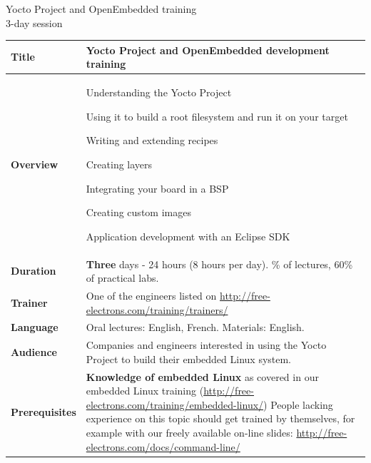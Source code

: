 \documentclass[a4paper,12pt,obeyspaces,spaces,hyphens]{article}
\begin{document}
\thispagestyle{fancy}

\setlength{\arrayrulewidth}{0.8pt}

\begin{center}
\LARGE
Yocto Project and OpenEmbedded training\\
\large
3-day session
\end{center}
\vspace{1cm}

\small
{}

 {
  \begin{tabularx}{\textwidth}{|g|h|}
    {\bf Title} & {\bf Yocto Project and OpenEmbedded development training} \\
    \hline

    {\bf Overview} &
    Understanding the Yocto Project \par
    Using it to build a root filesystem and run it on your target \par
    Writing and extending recipes \par
    Creating layers \par
    Integrating your board in a BSP \par
    Creating custom images \par
    Application development with an Eclipse SDK \\
    \hline

    {\bf Duration} & {\bf Three} days - 24 hours (8 hours per day).
    \% of lectures, 60\% of practical labs. \\
    \hline

    {\bf Trainer} & One of the engineers listed on
    \newline \url{http://free-electrons.com/training/trainers/}\\
    \hline

    {\bf Language} & Oral lectures: English, French.
    \newline Materials: English.\\
    \hline

    {\bf Audience} & Companies and engineers interested in using
    the Yocto Project to build their embedded Linux system.\\
    \hline

    {\bf Prerequisites} & {\bf Knowledge of embedded Linux} as covered
    in our embedded Linux training
    (\url{http://free-electrons.com/training/embedded-linux/}) \vspace{1em}
    \newline People lacking experience on this topic should get
    trained by themselves, for example with our freely available
    on-line slides:
    \newline \url{http://free-electrons.com/docs/command-line/} \\
    \hline
  \end{tabularx}

}
\end{document}
